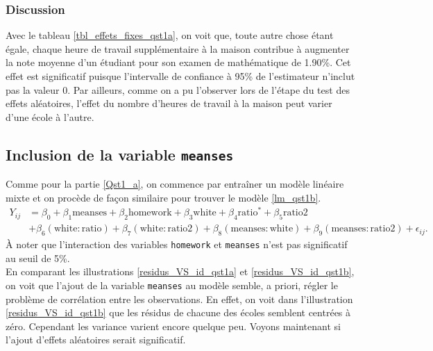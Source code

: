\documentclass{article}
\begin{document}
		
	\subsubsection*{Discussion}
		Avec le tableau \ref{tbl_effets_fixes_qst1a}, on voit que, toute autre chose étant égale, chaque heure de travail supplémentaire à la maison contribue à augmenter la note moyenne d'un étudiant pour son examen de mathématique de 1.90\%. Cet effet est significatif puisque l'intervalle de confiance à 95\% de l'estimateur n'inclut pas la valeur 0. Par ailleurs, comme on a pu l'observer lors de l'étape du test des effets aléatoires, l'effet du nombre d'heures de travail à la maison peut varier d'une école à l'autre.
		
\subsection{Inclusion de la variable \texttt{meanses}}\label{Qst1_b}
	Comme pour la partie \ref{Qst1_a}, on commence par entraîner un modèle linéaire mixte et on procède de façon similaire pour trouver le modèle \eqref{lm_qst1b}.
	\begin{align}\label{lm_qst1b}
		Y_{ij} &= \beta_0 + \beta_1 \mathrm{meanses} + \beta_2\mathrm{homework} + \beta_3\mathrm{white} + \beta_4\mathrm{ratio^*} + \beta_5\mathrm{ratio2} \\
		&+ \beta_6(\mathrm{white:ratio}) + \beta_7(\mathrm{white:ratio2}) + \beta_8(\mathrm{meanses:white}) + \beta_9(\mathrm{meanses:ratio2}) + \epsilon_{ij}.\nonumber
	\end{align}
	À noter que l'interaction des variables \texttt{homework} et \texttt{meanses} n'est pas significatif au seuil de 5\%.\\
	
	En comparant les illustrations \ref{residus_VS_id_qst1a} et \ref{residus_VS_id_qst1b}, on voit que l'ajout de la variable \texttt{meanses} au modèle semble, a priori, régler le problème de corrélation entre les observations. En effet, on voit dans l'illustration \ref{residus_VS_id_qst1b} que les résidus de chacune des écoles semblent centrées à zéro. Cependant les variance varient encore quelque peu. Voyons maintenant si l'ajout d'effets aléatoires serait significatif.
\end{document}
